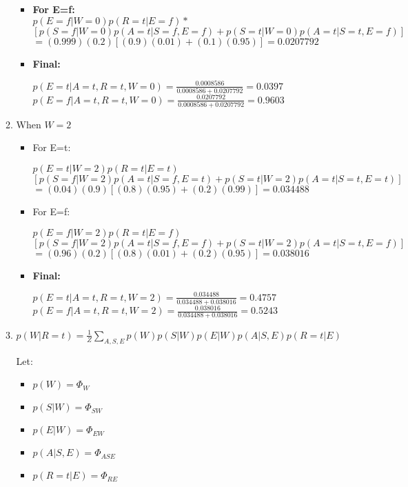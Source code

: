 \documentclass{article}
\begin{document}
\begin{enumerate}[label=(\alph*)]
\begin{enumerate}[label=\roman*.]
\begin{itemize}
\item \textbf{For E=f:} \\
$p(E=f|W=0)p(R=t|E=f)*$ \\
$[p(S=f|W=0)p(A=t|S=f,E=f)+p(S=t|W=0)p(A=t|S=t,E=f)]$ \\
$=(0.999)(0.2)[(0.9)(0.01)+(0.1)(0.95)]=0.0207792$

\item \textbf{Final:}

$p(E=t|A=t,R=t,W=0)=\frac{0.0008586}{0.0008586+0.0207792}=0.0397$ \\

$p(E=f|A=t,R=t,W=0)=\frac{0.0207792}{0.0008586+0.0207792}=0.9603$

\end{itemize}


\item When $W=2$

\begin{itemize}

\item For E=t:

$p(E=t|W=2)p(R=t|E=t)$ \\ $[p(S=f|W=2)p(A=t|S=f,E=t)+p(S=t|W=2)p(A=t|S=t,E=t)]$ \\
$=(0.04)(0.9)[(0.8)(0.95)+(0.2)(0.99)]=0.034488$

\item For E=f:

$p(E=f|W=2)p(R=t|E=f)$ \\ $[p(S=f|W=2)p(A=t|S=f,E=f)+p(S=t|W=2)p(A=t|S=t,E=f)]$ \\
$=(0.96)(0.2)[(0.8)(0.01)+(0.2)(0.95)]=0.038016$

\item \textbf{Final:}

$p(E=t|A=t,R=t,W=2)=\frac{0.034488}{0.034488+0.038016}=0.4757$ \\
$p(E=f|A=t,R=t,W=2)=\frac{0.038016}{0.034488+0.038016}=0.5243$

\end{itemize}


\item $p(W|R=t)=\frac{1}{Z}\sum_{A,S,E}p(W)p(S|W)p(E|W)p(A|S,E)p(R=t|E)$

Let:
\begin{itemize}
\item $p(W) = \Phi_W$
\item$p(S|W)=\Phi_{SW}$
\item$p(E|W)=\Phi_{EW}$
\item$p(A|S,E)=\Phi_{ASE}$
\item$p(R=t|E)=\Phi_{RE}$
\end{itemize}


\end{enumerate}
\end{enumerate}
\end{document}
